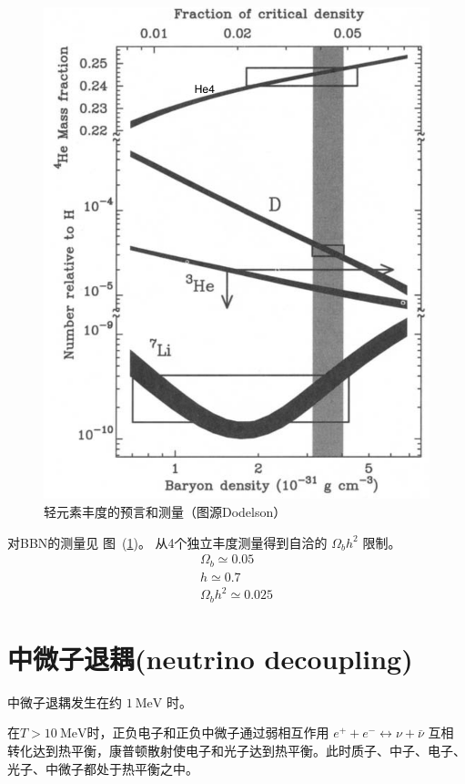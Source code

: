 \documentclass[]{ctexart}
\newcommand{\reffig}[1]{图~(\ref{#1})}
\begin{document}
\begin{figure}[!hbtp]
	\centering
	\includegraphics[width=1.0\linewidth]{BBN.png}
	\caption{轻元素丰度的预言和测量（图源Dodelson）} \label{fig:BBN}
\end{figure}

对BBN的测量见 \reffig{fig:BBN}。
从4个独立丰度测量得到自洽的 $\Omega_b h^2$ 限制。
\begin{eqnarray}
    \Omega_b \simeq 0.05 \\ 
    h\simeq 0.7 \\ 
    \Omega_b h^2 \simeq 0.025
\end{eqnarray}


\section{中微子退耦(neutrino decoupling)}

中微子退耦发生在约 $1 \mathrm{~MeV}$ 时。

在$T> 10 \mathrm{~MeV}$时，正负电子和正负中微子通过弱相互作用 $e^+ + e^- \leftrightarrow \nu + \bar{\nu}$ 互相转化达到热平衡，康普顿散射使电子和光子达到热平衡。此时质子、中子、电子、光子、中微子都处于热平衡之中。
\end{document}
